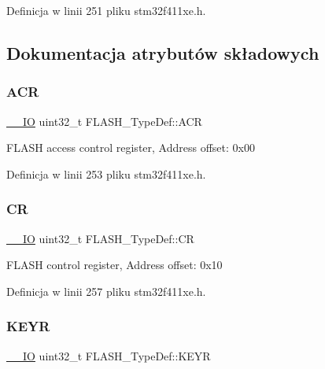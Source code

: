 Definicja w linii 251 pliku stm32f411xe.\+h.



\subsection{Dokumentacja atrybutów składowych}
\mbox{\label{struct_f_l_a_s_h___type_def_aaf432a8a8948613f4f66fcace5d2e5fe}} 
\subsubsection{\texorpdfstring{A\+CR}{ACR}}
{\footnotesize\ttfamily \hyperlink{core__sc300_8h_aec43007d9998a0a0e01faede4133d6be}{\+\_\+\+\_\+\+IO} uint32\+\_\+t F\+L\+A\+S\+H\+\_\+\+Type\+Def\+::\+A\+CR}

F\+L\+A\+SH access control register, Address offset\+: 0x00 

Definicja w linii 253 pliku stm32f411xe.\+h.

\mbox{\label{struct_f_l_a_s_h___type_def_a7919306d0e032a855200420a57f884d7}} 
\subsubsection{\texorpdfstring{CR}{CR}}
{\footnotesize\ttfamily \hyperlink{core__sc300_8h_aec43007d9998a0a0e01faede4133d6be}{\+\_\+\+\_\+\+IO} uint32\+\_\+t F\+L\+A\+S\+H\+\_\+\+Type\+Def\+::\+CR}

F\+L\+A\+SH control register, Address offset\+: 0x10 

Definicja w linii 257 pliku stm32f411xe.\+h.

\mbox{\label{struct_f_l_a_s_h___type_def_a802e9a26a89b44decd2d32d97f729dd3}} 
\subsubsection{\texorpdfstring{K\+E\+YR}{KEYR}}
{\footnotesize\ttfamily \hyperlink{core__sc300_8h_aec43007d9998a0a0e01faede4133d6be}{\+\_\+\+\_\+\+IO} uint32\+\_\+t F\+L\+A\+S\+H\+\_\+\+Type\+Def\+::\+K\+E\+YR}

